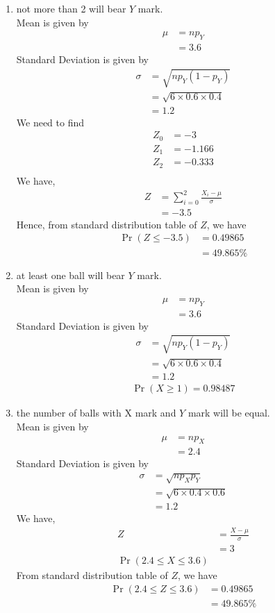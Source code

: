 \documentclass[journal,12pt,onecolumn]{IEEEtran}
\theoremstyle{remark}
\begin{document}
\begin{enumerate}
\item not more than 2 will bear $Y$ mark.\\
Mean is given by
\begin{align}
	\mu &= np_Y \\
	&= 3.6
\end{align}
Standard Deviation is given by
\begin{align}
	\sigma &= \sqrt{np_Y(1 - p_Y)}\\
	&= \sqrt{6 \times 0.6 \times 0.4}\\
	&=  1.2
\end{align}
We need to find
\begin{align}
       Z_0&=-3 \\
       Z_1&=-1.166 \\
       Z_2&=-0.333\\ 
\end{align}
We have,
\begin{align}
	Z &= \sum_{i=0}^{2}\frac{X_i - \mu}{\sigma} \\
	&= -3.5
\end{align}
Hence, from standard distribution table of $Z$, we have
\begin{align}
	\Pr(Z \le -3.5) &= 0.49865\\
	&= 49.865\%
\end{align}
\item at least one ball will bear $Y$ mark.\\
Mean is given by
\begin{align}
	\mu &= np_Y \\
	&= 3.6
\end{align}
Standard Deviation is given by
\begin{align}
	\sigma &= \sqrt{np_Y(1 - p_Y)}\\
	&= \sqrt{6 \times 0.6 \times 0.4}\\
	&=  1.2
\end{align}
\begin{align}
	\Pr(X \geq 1) = 0.98487
\end{align}
\item the number of balls with X mark and $Y$ mark will be equal.\\
Mean is given by
\begin{align}
	\mu &= np_X \\
	&= 2.4
\end{align}
Standard Deviation is given by
\begin{align}
	\sigma &= \sqrt{np_X p_Y}\\
	&= \sqrt{6 \times 0.4 \times 0.6}\\
	&=  1.2
\end{align}
We have,
\begin{align}
Z &= \frac{X - \mu}{\sigma} \\
	&= 3\\
        \Pr(2.4 \leq X\leq 3.6)	
\end{align}
From standard distribution table of $Z$, we have
\begin{align}
	\Pr(2.4 \leq Z\leq 3.6) &= 0.49865\\
	&= 49.865 \%
\end{align}
\end{enumerate}
\end{document}
